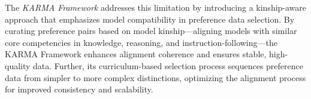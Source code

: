 The \textit{KARMA Framework} addresses this limitation by introducing a kinship-aware approach that emphasizes model compatibility in preference data selection. By curating preference pairs based on model kinship—aligning models with similar core competencies in knowledge, reasoning, and instruction-following—the KARMA Framework enhances alignment coherence and ensures stable, high-quality data. Further, its curriculum-based selection process sequences preference data from simpler to more complex distinctions, optimizing the alignment process for improved consistency and scalability.